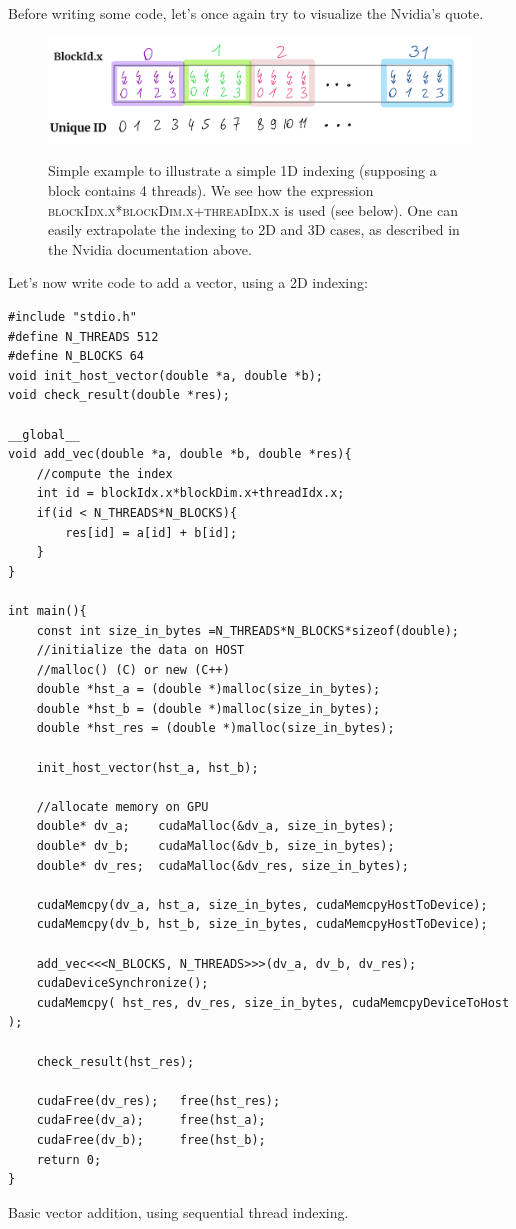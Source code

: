 \documentclass[12pt]{article}
\begin{document}
Before writing some code, let's once again try to visualize the Nvidia's quote.
\begin{figure}[H]
   \centering
   \includegraphics[scale=0.25]{pngs/tindexing.png}
   \label{tindexing}
   \caption{Simple example to illustrate a simple 1D indexing (supposing a block 
   contains 4 threads). We see how the expression \textsc{blockIdx.x*blockDim.x+threadIdx.x} is used (see below). 
   One can easily extrapolate the indexing to 2D and 3D cases, as described in the Nvidia documentation above.
   }
\end{figure}

Let's now write code to add a vector, using a 2D indexing: 

\begin{listing}
\begin{verbatim}
#include "stdio.h"
#define N_THREADS 512
#define N_BLOCKS 64 
void init_host_vector(double *a, double *b);
void check_result(double *res);

__global__ 
void add_vec(double *a, double *b, double *res){
    //compute the index
    int id = blockIdx.x*blockDim.x+threadIdx.x;
    if(id < N_THREADS*N_BLOCKS){
        res[id] = a[id] + b[id];
    }
}

int main(){
    const int size_in_bytes =N_THREADS*N_BLOCKS*sizeof(double);
    //initialize the data on HOST
    //malloc() (C) or new (C++) 
    double *hst_a = (double *)malloc(size_in_bytes);
    double *hst_b = (double *)malloc(size_in_bytes);
    double *hst_res = (double *)malloc(size_in_bytes);

    init_host_vector(hst_a, hst_b);

    //allocate memory on GPU
    double* dv_a;    cudaMalloc(&dv_a, size_in_bytes);
    double* dv_b;    cudaMalloc(&dv_b, size_in_bytes);
    double* dv_res;  cudaMalloc(&dv_res, size_in_bytes);

    cudaMemcpy(dv_a, hst_a, size_in_bytes, cudaMemcpyHostToDevice);
    cudaMemcpy(dv_b, hst_b, size_in_bytes, cudaMemcpyHostToDevice);

    add_vec<<<N_BLOCKS, N_THREADS>>>(dv_a, dv_b, dv_res);
    cudaDeviceSynchronize();
    cudaMemcpy( hst_res, dv_res, size_in_bytes, cudaMemcpyDeviceToHost );

    check_result(hst_res);

    cudaFree(dv_res);   free(hst_res);
    cudaFree(dv_a);     free(hst_a);  
    cudaFree(dv_b);     free(hst_b);
    return 0;
}
\end{verbatim}
    \caption{Basic vector addition, using sequential thread indexing. \cite{tuomanen2018hands}}
\end{listing}
\end{document}

